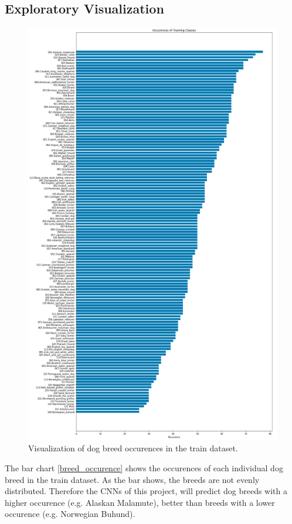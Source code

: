 \documentclass{article}
\begin{document}
\subsection{Exploratory Visualization}
\begin{figure}[H]
    \centering
    \includegraphics[scale=0.35]{./images/dog_breed_occurence}
    \caption{Visualization of dog breed occurences in the train dataset.}
    \label{fig:breed_occurence}
\end{figure}
The bar chart \ref{breed_occurence} shows the occurences of each individual dog breed in the train dataset. As the bar shows, the breeds are not evenly distributed. Therefore the CNNs of this project, will predict dog breeds with a higher occurence (e.g. Alaskan Malamute), better than breeds with a lower occurence (e.g. Norwegian Buhund).
\end{document}

